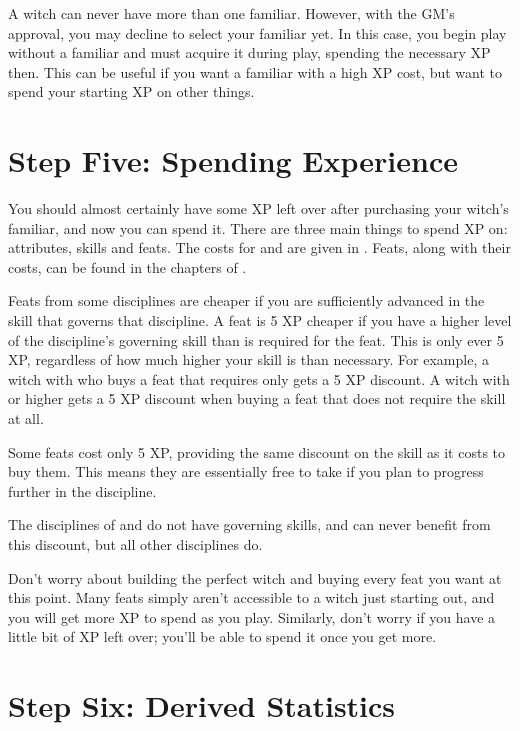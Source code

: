 A witch can never have more than one familiar.
However, with the GM's approval, you may decline to select your familiar yet.
In this case, you begin play without a familiar and must acquire it during play, spending the necessary XP then.
This can be useful if you want a familiar with a high XP cost, but want to spend your starting XP on other things.

\section{Step Five: Spending Experience}

You should almost certainly have some XP left over after purchasing your witch's familiar, and now you can spend it.
There are three main things to spend XP on: attributes, skills and feats.
The costs for  and  are given in .
Feats, along with their costs, can be found in the chapters of .

Feats from some disciplines are cheaper if you are sufficiently advanced in the skill that governs that discipline.
A feat is 5 XP cheaper if you have a higher level of the discipline's governing skill than is required for the feat.
This is only ever 5 XP, regardless of how much higher your skill is than necessary.
For example, a witch with  who buys a  feat that requires only  gets a 5 XP discount.
A witch with  or higher gets a 5 XP discount when buying a  feat that does not require the  skill at all.

Some feats cost only 5 XP, providing the same discount on the skill as it costs to buy them.
This means they are essentially free to take if you plan to progress further in the discipline.

The disciplines of  and  do not have governing skills, and can never benefit from this discount, but all other disciplines do.

Don't worry about building the perfect witch and buying every feat you want at this point.
Many feats simply aren't accessible to a witch just starting out, and you will get more XP to spend as you play.
Similarly, don't worry if you have a little bit of XP left over; you'll be able to spend it once you get more.

\section{Step Six: Derived Statistics}

